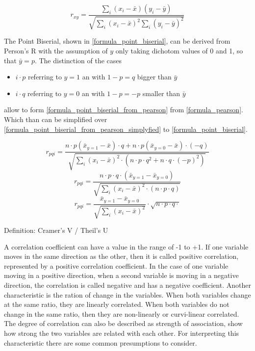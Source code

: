 \documentclass[a4paper,12pt]{report}
\begin{document}
\smallskip

\begin{equation}
\label{formula_pearson}	
	r_{xy} =  \frac{\sum_{i}{(x_i-\bar{x})(y_i-\bar{y})}}{\sqrt{\sum_{i}{(x_i-\bar{x})^2}\sum_{i}{(y_i-\bar{y})^2}}}
\end{equation}

\bigskip

The Point Biserial, shown in \ref{formula_point_biserial}, can be derived from Person's R with the assumption of $y$ only taking dichotom values of 0 and 1, so that $\bar{y} = p$. The distinction of the cases 
\begin{itemize}
	\item $i \cdot p$ referring to $y=1$ an with $1 - p = q$ bigger than $\bar{y}$
	\item $i \cdot q$ referring to $y=0$ an with $1 - p = -p$ smaller than $\bar{y}$
\end{itemize}
allow to form \ref{formula_point_biserial_from_pearson} from \ref{formula_pearson}. Which than can be simplified over \ref{formula_point_biserial_from_pearson_simplyfied} to \ref{formula_point_biserial}. \cite{Tate1954,CohenWest2003,Bortz2004}

\smallskip

\begin{equation}
\label{formula_point_biserial_from_pearson}
	r_{pqi} =  \frac{n \cdot p (\bar{x}_{y=1}-\bar{x}) \cdot q + n \cdot p (\bar{x}_{y=0}-\bar{x}) \cdot (-q)}{\sqrt{\sum_{i}{(x_i-\bar{x})^2} \cdot (n \cdot p \cdot q^2 + n \cdot q \cdot (-p)^2)}}
\end{equation}
\begin{equation}
\label{formula_point_biserial_from_pearson_simplyfied}
	r_{pqi} =  \frac{n \cdot p \cdot q \cdot (\bar{x}_{y=1}-\bar{x}_{y=0})}{\sqrt{\sum_{i}{(x_i-\bar{x})^2} \cdot (n \cdot p \cdot q)}}
\end{equation}
\begin{equation}
\label{formula_point_biserial}
	r_{pqi} =  \frac{\bar{x}_{y=1}-\bar{x}_{y=0}}{\sqrt{\sum_{i}{(x_i-\bar{x})^2}}} \cdot \sqrt{n \cdot p \cdot q \cdot} 
\end{equation}
\smallskip

Definition: Cramer’s V / Theil’s U

A correlation coefficient can have a value in the range of -1 to +1. If one variable moves in the same direction as the other, then it is called positive correlation, represented by a positive correlation coefficient. In the case of one variable moving in a positive direction, when a second variable is moving in a negative direction, the correlation is called negative and has a negative coefficient. 
Another characteristic is the ration of change in the variables. When both variables change at the same ratio, they are linearly correlated. When both variables do not change in the same ratio, then they are non-linearly or curvi-linear correlated.
The degree of correlation can also be described as strength of association, show how strong the two variables are related with each other. For interpreting this characteristic there are some common presumptions to consider.
\end{document}
